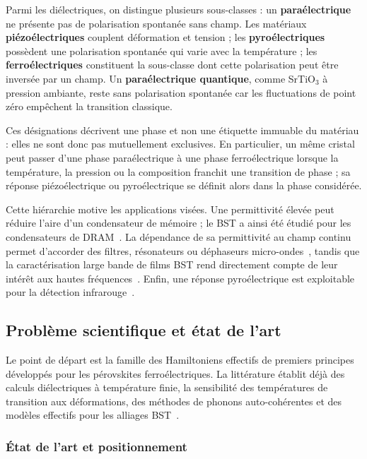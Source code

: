 \documentclass{rapportCS}
\begin{document}
Parmi les diélectriques, on distingue plusieurs sous-classes : un \textbf{paraélectrique}
ne présente pas de polarisation spontanée sans
champ. Les matériaux \textbf{piézoélectriques} couplent déformation et tension ; les
\textbf{pyroélectriques} possèdent une polarisation spontanée qui varie avec la
température ; les \textbf{ferroélectriques} constituent la sous-classe dont cette
polarisation peut être inversée par un champ. Un \textbf{paraélectrique quantique},
comme SrTiO$_3$ à pression ambiante, reste sans polarisation spontanée car les
fluctuations de point zéro empêchent la transition classique.

Ces désignations décrivent une phase et non une étiquette immuable du matériau :
elles ne sont donc pas mutuellement exclusives. En particulier, un même cristal
peut passer d'une phase paraélectrique à une phase ferroélectrique lorsque la
température, la pression ou la composition franchit une transition de phase ;
sa réponse piézoélectrique ou pyroélectrique se définit alors dans la phase
considérée.

Cette hiérarchie motive les applications visées. Une permittivité élevée peut
réduire l'aire d'un condensateur de mémoire ; le BST a ainsi été étudié pour
les condensateurs de DRAM~\cite{EzhilvalavanTseng2000}. La dépendance de sa
permittivité au champ continu permet d'accorder des filtres, résonateurs ou
déphaseurs micro-ondes~\cite{Tagantsev2003}, tandis que la caractérisation
large bande de films BST rend directement compte de leur intérêt aux hautes
fréquences~\cite{Marksz2021}. Enfin, une réponse pyroélectrique est exploitable
pour la détection infrarouge~\cite{Liu2002}.

\subsection{Problème scientifique et état de l'art}

Le point de départ est la famille des Hamiltoniens effectifs de premiers
principes développés pour les pérovskites ferroélectriques. La littérature
établit déjà des calculs diélectriques à température finie, la sensibilité des
températures de transition aux déformations, des méthodes de phonons
auto-cohérentes et des modèles effectifs pour les alliages
BST~\cite{Zhong1995,Nishimatsu2010,Bianco2017,Walizer2006}.

\subsubsection{État de l'art et positionnement}
\end{document}
